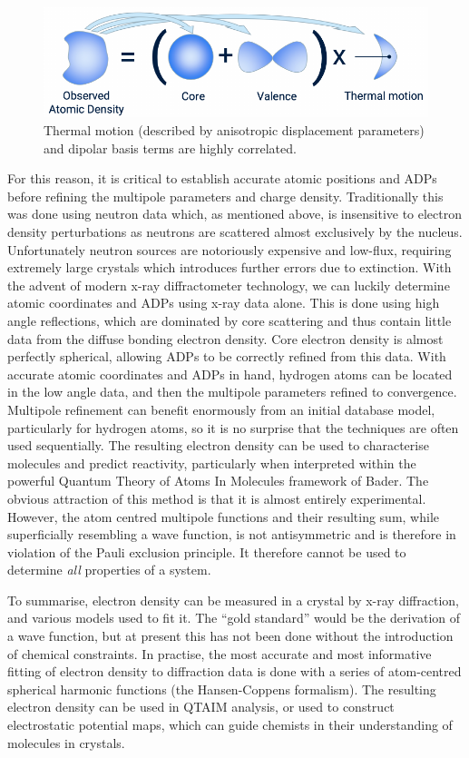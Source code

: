 \begin{refsection}
\begin{figure}
    \centering
    \includegraphics[width=0.6\linewidth]{Figures/valencevsthermaled.pdf}
    \caption[Correlation of thermal and dipolar functions.]{Thermal motion (described by anisotropic displacement parameters) and dipolar basis terms are highly correlated.}\label{fig:adp-dipole}
\end{figure}

For this reason, it is critical to establish accurate atomic positions and ADPs before refining the multipole parameters and charge density.
Traditionally this was done using neutron data which, as mentioned above, is insensitive to electron density perturbations as neutrons are scattered almost exclusively by the nucleus.
Unfortunately neutron sources are notoriously expensive and low-flux, requiring extremely large crystals which introduces further errors due to extinction.
With the advent of modern x-ray diffractometer technology, we can luckily determine atomic coordinates and ADPs using x-ray data alone.
This is done using high angle reflections, which are dominated by core scattering and thus contain little data from the diffuse bonding electron density.
Core electron density is almost perfectly spherical, allowing ADPs to be correctly refined from this data.
With accurate atomic coordinates and ADPs in hand, hydrogen atoms can be located in the low angle data, and then the multipole parameters refined to convergence.
Multipole refinement can benefit enormously from an initial database model, particularly for hydrogen atoms, so it is no surprise that the techniques are often used sequentially.\autocite{Guillot2001,Volkov2006}
The resulting electron density can be used to characterise molecules and predict reactivity, particularly when interpreted within the powerful Quantum Theory of Atoms In Molecules framework of Bader.\autocite{Bader1991}
The obvious attraction of this method is that it is almost entirely experimental.
However, the atom centred multipole functions and their resulting sum, while superficially resembling a wave function, is not antisymmetric and is therefore in violation of the Pauli exclusion principle.
It therefore cannot be used to determine \emph{all} properties of a system.

To summarise, electron density can be measured in a crystal by x-ray diffraction, and various models used to fit it.
The ``gold standard'' would be the derivation of a wave function, but at present this has not been done without the introduction of chemical constraints.
In practise, the most accurate and most informative fitting of electron density to diffraction data is done with a series of atom-centred spherical harmonic functions (the Hansen-Coppens formalism).
The resulting electron density can be used in QTAIM analysis, or used to construct electrostatic potential maps, which can guide chemists in their understanding of molecules in crystals.


\end{refsection}
